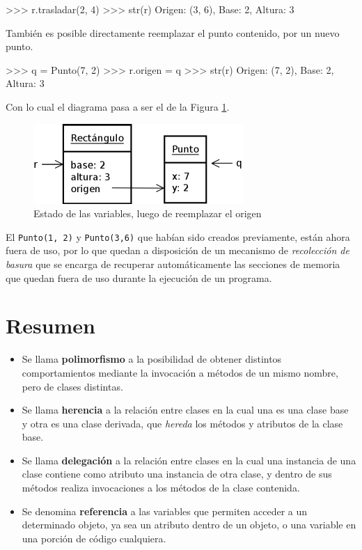 \begin{codigo-python-sn}
>>> r.trasladar(2, 4)
>>> str(r)
Origen: (3, 6), Base: 2, Altura: 3
\end{codigo-python-sn}

También es posible directamente reemplazar el punto contenido, por un nuevo
punto.

\begin{codigo-python-sn}
>>> q = Punto(7, 2)
>>> r.origen = q
>>> str(r)
Origen: (7, 2), Base: 2, Altura: 3
\end{codigo-python-sn}

Con lo cual el diagrama pasa a ser el de la Figura
\ref{rectangulo_punto_b}.

\begin{figure}[htb]
\includegraphics{graficos/15_Rectangulo_Punto_b}
\caption{Estado de las variables, luego de reemplazar el origen}
\label{rectangulo_punto_b}
\end{figure}

\begin{observacion}
El \lstinline!Punto(1, 2)! y \lstinline!Punto(3,6)! que habían sido creados
previamente, están ahora fuera de uso, por lo que quedan a disposición de un
mecanismo de {\it recolección de basura} que se encarga de recuperar
automáticamente las secciones de memoria que quedan fuera de uso durante la
ejecución de un programa.
\end{observacion}

\section{Resumen}

\begin{itemize}
\item Se llama {\bf polimorfismo} a la posibilidad de obtener distintos
comportamientos mediante la invocación a métodos de un mismo nombre, pero de
clases distintas.

\item Se llama {\bf herencia} a la relación entre clases en la cual una es una
clase base y otra es una clase derivada, que {\it hereda} los métodos y
atributos de la clase base.

\item Se llama {\bf delegación} a la relación entre clases en la cual una
instancia de una clase contiene como atributo una instancia de otra clase,
y dentro de sus métodos realiza invocaciones a los métodos de la clase
contenida.

\item Se denomina {\bf referencia} a las variables que permiten acceder a
un determinado objeto, ya sea un atributo dentro de un objeto, o una
variable en una porción de código cualquiera.
\end{itemize}


